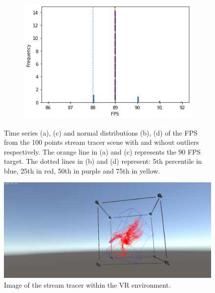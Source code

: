 \begin{figure}[t]
\begin{subfigure}{.45\textwidth}
        \caption{}
    \end{subfigure}
    \begin{subfigure}{.45\textwidth}
        \centering
        \includegraphics[width=\textwidth]{pictures/analysis stream tracer 100/output_14_0.png}
        \caption{}
    \end{subfigure}
    \caption{Time series (a), (c) and normal distributions (b), (d) of the FPS from the 100 points stream tracer scene with and wihout outliers respectively. The orange line in (a) and (c) represents the 90 FPS target. The dotted lines in (b) and (d) represent: 5th percentile in blue, 25th in red, 50th in purple and 75th in yellow.}
    \label{fig:stream-tracer-100-analysis}
\end{figure}

\begin{figure}
    \centering
    \includegraphics[width=\textwidth]{pictures/stream-tracer-100.png}
    \caption{Image of the stream tracer within the VR environment.}
    \label{fig:stream-tracer-100}
\end{figure}

